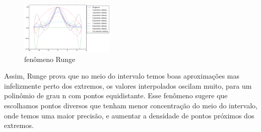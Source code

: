 \begin{figure}[!h]
\includegraphics[width=0.4\textwidth, center]{figuras/fenomeno_runge.png}
\caption{fenômeno Runge}
\end{figure}

 Assim, Runge prova que no meio do intervalo temos boas aproximações mas infelizmente perto dos extremos, os valores interpolados oscilam muito, para um polinômio de grau n com pontos equidistante. Esse fenômeno sugere que escolhamos pontos diversos que tenham menor concentração do meio do intervalo, onde temos uma maior precisão, e aumentar a densidade de pontos próximos dos extremos.


